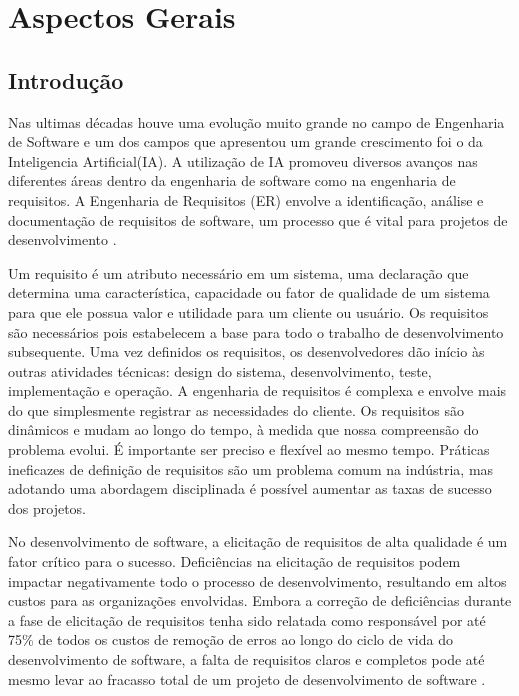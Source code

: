 \part{Aspectos Gerais}

\chapter[Introdução]{Introdução}




Nas ultimas décadas houve uma evolução muito grande no campo de Engenharia de Software 
e um dos campos que apresentou um grande crescimento foi o da Inteligencia Artificial(IA).
A utilização de IA promoveu diversos avanços nas diferentes áreas dentro da engenharia de software
como na engenharia de requisitos\cite{sofian2022systematic}. A Engenharia de Requisitos (ER) envolve a identificação, análise e documentação de requisitos de software, um processo que é vital para projetos de desenvolvimento \cite{Sommerville2007}.

Um requisito é um atributo necessário em um sistema, uma declaração que determina uma característica, capacidade ou fator de qualidade de um sistema para que ele possua valor e utilidade para um cliente ou usuário. Os requisitos são necessários pois estabelecem a base para todo o trabalho de desenvolvimento subsequente. Uma vez definidos os requisitos, os desenvolvedores dão início às outras atividades técnicas: design do sistema, desenvolvimento, teste, implementação e operação.
A engenharia de requisitos é complexa e envolve mais do que simplesmente registrar as necessidades do cliente. Os requisitos são dinâmicos e mudam ao longo do tempo, à medida que nossa compreensão do problema evolui. É importante ser preciso e flexível ao mesmo tempo. Práticas ineficazes de definição de requisitos são um problema comum na indústria, mas adotando uma abordagem disciplinada é possível aumentar as taxas de sucesso dos projetos\cite{young2004requirements}.

No desenvolvimento de software, a elicitação de requisitos de alta qualidade é um fator crítico para o sucesso. Deficiências na elicitação de requisitos podem impactar negativamente todo o processo de desenvolvimento, resultando em altos custos para as organizações envolvidas. Embora a correção de deficiências durante a fase de elicitação de requisitos tenha sido relatada como responsável por até 75\% de todos os custos de remoção de erros ao longo do ciclo de vida do desenvolvimento de software, a falta de requisitos claros e completos pode até mesmo levar ao fracasso total de um projeto de desenvolvimento de software \cite{urquhart1999themes}.


